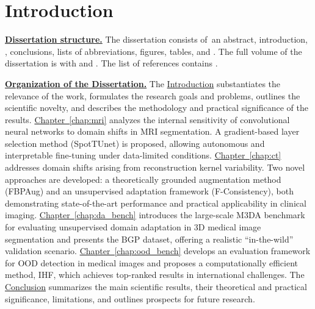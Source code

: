 

\chapter*{Introduction}
\label{chap:Introduction}



\underline{\textbf{Dissertation structure.}}
The dissertation consists of~an abstract, introduction, , conclusions, lists of abbreviations, figures, tables, and . The full volume of the dissertation is  with  and . The list of references contains .

\underline{\textbf{Organization of the Dissertation.}}
The \underline{Introduction} substantiates the relevance of the work, formulates the research goals and problems, outlines the scientific novelty, and describes the methodology and practical significance of the results.
\underline{Chapter~\ref{chap:mri}} analyzes the internal sensitivity of convolutional neural networks to domain shifts in MRI segmentation. A gradient-based layer selection method (SpotTUnet) is proposed, allowing autonomous and interpretable fine-tuning under data-limited conditions.
\underline{Chapter~\ref{chap:ct}} addresses domain shifts arising from reconstruction kernel variability. Two novel approaches are developed: a theoretically grounded augmentation method (FBPAug) and an unsupervised adaptation framework (F-Consistency), both demonstrating state-of-the-art performance and practical applicability in clinical imaging.
\underline{Chapter~\ref{chap:da_bench}} introduces the large-scale M3DA benchmark for evaluating unsupervised domain adaptation in 3D medical image segmentation and presents the BGP dataset, offering a realistic “in-the-wild” validation scenario.
\underline{Chapter~\ref{chap:ood_bench}}  develops an evaluation framework for OOD detection in medical images and proposes a computationally efficient method, IHF, which achieves top-ranked results in international challenges.
The \underline{Conclusion} summarizes the main scientific results, their theoretical and practical significance, limitations, and outlines prospects for future research.








